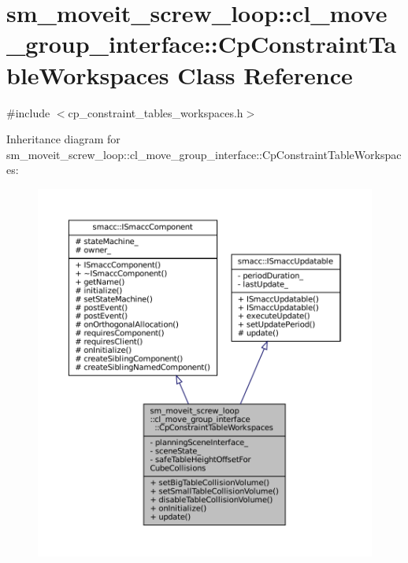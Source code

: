 \hypertarget{classsm__moveit__screw__loop_1_1cl__move__group__interface_1_1CpConstraintTableWorkspaces}{}\section{sm\+\_\+moveit\+\_\+screw\+\_\+loop\+:\+:cl\+\_\+move\+\_\+group\+\_\+interface\+:\+:Cp\+Constraint\+Table\+Workspaces Class Reference}
\label{classsm__moveit__screw__loop_1_1cl__move__group__interface_1_1CpConstraintTableWorkspaces}


{\ttfamily \#include $<$cp\+\_\+constraint\+\_\+tables\+\_\+workspaces.\+h$>$}



Inheritance diagram for sm\+\_\+moveit\+\_\+screw\+\_\+loop\+:\+:cl\+\_\+move\+\_\+group\+\_\+interface\+:\+:Cp\+Constraint\+Table\+Workspaces\+:
\nopagebreak
\begin{figure}[H]
\begin{center}
\leavevmode
\includegraphics[width=350pt]{classsm__moveit__screw__loop_1_1cl__move__group__interface_1_1CpConstraintTableWorkspaces__inherit__graph}
\end{center}
\end{figure}


